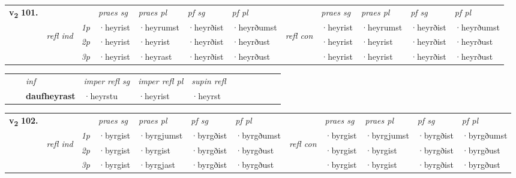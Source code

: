 \begin{tabular}{llllllllllll} \toprule
\multirow{4}{*}{{{\textbf{v{\textsubscript{2}}} \Large{\textbf{101.}}}}}  & &   &  \textit{praes sg}  & \textit{praes pl}  &\textit{pf sg} & \textit{pf pl} &  &  \textit{praes sg}  & \textit{praes pl}  & \textit{pf sg} & \textit{pf pl } \\*
	\cmidrule{4-7} \cmidrule{9-12}
 &\multirow{3}{*}{\begin{turn}{90}\textit{refl ind}\end{turn}} & {\textit{1p}} & ·heyrist & ·heyrumst    & ·heyrðist & ·heyrðumst & \multirow{3}{*}{\begin{turn}{90}\textit{refl con}\end{turn}}  &·heyrist & ·heyrumst & ·heyrðist & ·heyrðumst\\*
 &&  {\textit{2p}} &  ·heyrist  & ·heyrist   & ·heyrðist & ·heyrðust & &·heyrist & ·heyrist & ·heyrðist & ·heyrðust \\*
& &  {\textit{3p}} & ·heyrist & ·heyrast   & ·heyrðist & ·heyrðust & & ·heyrist & ·heyrist& ·heyrðist & ·heyrðust  \\*
\cmidrule{4-7} \cmidrule{9-12}
\end{tabular}


\begin{tabular}{llllllllllll}
 & & \textit{inf}   & \textit{imper refl sg} & \textit{imper refl pl}   & \textit{supin refl}      \\*
  & & \textbf{daufheyrast}    & ·heyrstu & ·heyrist   & ·heyrst  \\*
\cmidrule{1-12}
\end{tabular}



\begin{tabular}{llllllllllll} \toprule
\multirow{4}{*}{{{\textbf{v{\textsubscript{2}}} \Large{\textbf{102.}}}}}  & &   &  \textit{praes sg}  & \textit{praes pl}  &\textit{pf sg} & \textit{pf pl} &  &  \textit{praes sg}  & \textit{praes pl}  & \textit{pf sg} & \textit{pf pl } \\*
	\cmidrule{4-7} \cmidrule{9-12}
 &\multirow{3}{*}{\begin{turn}{90}\textit{refl ind}\end{turn}} & {\textit{1p}} & ·byrgist & ·byrgjumst    & ·byrgðist & ·byrgðumst & \multirow{3}{*}{\begin{turn}{90}\textit{refl con}\end{turn}}  &·byrgist & ·byrgjumst & ·byrgðist & ·byrgðumst\\*
 &&  {\textit{2p}} &  ·byrgist  & ·byrgist   & ·byrgðist & ·byrgðust & &·byrgist & ·byrgist & ·byrgðist & ·byrgðust \\*
& &  {\textit{3p}} & ·byrgist & ·byrgjast   & ·byrgðist & ·byrgðust & & ·byrgist & ·byrgist& ·byrgðist & ·byrgðust  \\*
\cmidrule{4-7} \cmidrule{9-12}
\end{tabular}



